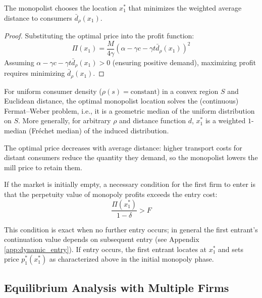 \documentclass{article}
\begin{document}
\begin{proposition}
  \label{prop:mono_center}
  The monopolist chooses the location $x_1^*$ that minimizes the weighted average distance to consumers $\bar{d}_{\rho}(x_1)$.
\end{proposition}

\begin{proof}
  Substituting the optimal price into the profit function:
  \begin{equation}
    \Pi(x_1) = \frac{M}{4\gamma}(\alpha - \gamma c - \gamma t \bar{d}_{\rho}(x_1))^2
  \end{equation}
  Assuming $\alpha - \gamma c - \gamma t \bar{d}_{\rho}(x_1) > 0$ (ensuring positive demand), maximizing profit requires minimizing $\bar{d}_{\rho}(x_1)$.
\end{proof}

\begin{remark}
  For uniform consumer density ($\rho(s) = \text{constant}$) in a convex region $S$ and Euclidean distance, the optimal monopolist location solves the (continuous) Fermat--Weber problem, i.e., it is a geometric median of the uniform distribution on $S$. More generally, for arbitrary $\rho$ and distance function $d$, $x_1^*$ is a weighted $1$-median (Fr{\'e}chet median) of the induced distribution.
\end{remark}

\begin{remark}
  The optimal price decreases with average distance: higher transport costs for distant consumers reduce the quantity they demand, so the monopolist lowers the mill price to retain them.
\end{remark}

If the market is initially empty, a necessary condition for the first firm to enter is that the perpetuity value of monopoly profits exceeds the entry cost:
\begin{equation}
  \frac{\Pi(x_1^*)}{1-\delta} > F
\end{equation}

This condition is exact when no further entry occurs; in general the first entrant's continuation value depends on subsequent entry (see Appendix \ref{app:dynamic_entry}).
If entry occurs, the first entrant locates at $x_1^*$ and sets price $p_1^*(x_1^*)$ as characterized above in the initial monopoly phase.

\subsection*{Equilibrium Analysis with Multiple Firms}
\end{document}
